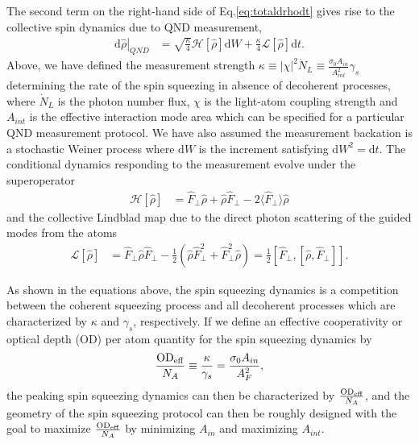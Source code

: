 \documentclass[pra,twocolumn,floatfix,superscriptaddress]{revtex4-1} %
\newcommand{\expect}[1]{\big\langle #1 \big\rangle}
\begin{document}
The second term on the right-hand side of Eq.\eqref{eq:totaldrhodt} gives rise to the collective spin dynamics due to QND measurement,
\begin{align}
\left.\mathrm{d}\hat{\rho}\right|_{QND} &= \sqrt{\frac{\kappa}{4}}\mathcal{H}\left[\hat{\rho} \right]\mathrm{d}W + \frac{\kappa}{4}\mathcal{L}\left[ \hat{\rho}\right]\mathrm{d}t.
\end{align}
Above, we have defined the measurement strength $\kappa \equiv |\chi|^2\dot{N}_L\equiv \frac{\sigma_0A_{in}}{A_{int}^2}\gamma_s $ determining the rate of the spin squeezing in absence of decoherent processes, where $\dot{N}_L$ is the photon number flux, $\chi$ is the light-atom coupling strength and $A_{int}$ is the effective interaction mode area which can be specified for a particular QND measurement protocol. We have also assumed the measurement backation is a stochastic Weiner process where $\mathrm{d}W$ is the increment satisfying $\mathrm{d}W^2 = \mathrm{d}t$. The conditional dynamics responding to the measurement evolve under the superoperator
\begin{align}
\mathcal{H}\left[ \hat{\rho}\right] &= \hat{F}_\perp\hat{\rho} + \hat{\rho}\hat{F}_\perp -2\expect{\hat{F}_\perp}\hat{\rho}
\end{align}
and the collective Lindblad map due to the direct photon scattering of the guided modes from the atoms
\begin{align}
\mathcal{L}\left[ \hat{\rho} \right] &= \hat{F}_\perp\hat{\rho}\hat{F}_\perp-\frac{1}{2}\left(\hat{\rho}\hat{F}_\perp^2+\hat{F}_\perp^2\hat{\rho} \right)=\frac{1}{2}\left[\hat{F}_\perp,\left[\hat{\rho},\hat{F}_\perp \right] \right].
\end{align}

As shown in the equations above, the spin squeezing dynamics is a competition between the coherent squeezing process and all decoherent processes which are characterized by $\kappa$ and $\gamma_s$, respectively. 
If we define an effective cooperativity or optical depth (OD) per atom quantity for the spin squeezing dynamics by
\begin{align}
\frac{\mathrm{OD}_{\rm eff}}{N_A} \equiv \frac{\kappa}{\gamma_s}=\frac{\sigma_0A_{in}}{A_F^2},
\end{align}
the peaking spin squeezing dynamics can then be characterized by $\frac{\mathrm{OD}_{\rm eff}}{N_A}$, and the geometry of the spin squeezing protocol can then be roughly designed with the goal to maximize $\frac{\mathrm{OD}_{\rm eff}}{N_A}$ by minimizing $A_{in}$ and maximizing $A_{int}$.  
\end{document}
